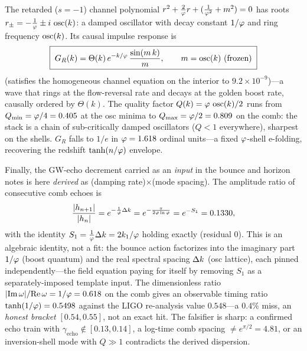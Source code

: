 The retarded ($s=-1$) channel polynomial $r^2+\tfrac{2}{\varphi}r+(\tfrac{1}{\varphi^2}+m^2)=0$ has roots $r_\pm=-\tfrac{1}{\varphi}\pm i\,\operatorname{osc}(k)$: a damped oscillator with decay constant $1/\varphi$ and ring frequency $\operatorname{osc}(k)$. Its causal impulse response is
\begin{equation}
\boxed{\;G_R(k)=\Theta(k)\,e^{-k/\varphi}\,\frac{\sin(m\,k)}{m},\qquad m=\operatorname{osc}(k)\ \text{(frozen)}\;}
\label{eq:fieldeq:greenR}
\end{equation}
(satisfies the homogeneous channel equation on the interior to $9.2\times10^{-9}$)---a wave that rings at the flow-reversal rate and decays at the golden boost rate, causally ordered by $\Theta(k)$. The quality factor $Q(k)=\varphi\,\operatorname{osc}(k)/2$ runs from $Q_{\min}=\varphi/4=0.405$ at the osc minima to $Q_{\max}=\varphi/2=0.809$ on the comb: the stack is a chain of sub-critically damped oscillators ($Q<1$ everywhere), sharpest on the shells. $G_R$ falls to $1/e$ in $\varphi=1.618$ ordinal units---a fixed $\varphi$-shell e-folding, recovering the redshift $\tanh(n/\varphi)$ envelope.

Finally, the GW-echo decrement carried as an \emph{input} in the bounce and horizon notes is here \emph{derived} as (damping rate)$\times$(mode spacing). The amplitude ratio of consecutive comb echoes is
\begin{equation}
\frac{|h_{n+1}|}{|h_n|}=e^{-\frac{1}{\varphi}\Delta k}=e^{-\frac{\pi}{2\varphi\ln\varphi}}=e^{-S_1}=0.1330,
\label{eq:fieldeq:echo}
\end{equation}
with the identity $S_1=\tfrac{1}{\varphi}\Delta k=2k_1/\varphi$ holding exactly (residual $0$). This is an algebraic identity, not a fit: the bounce action factorizes into the imaginary part $1/\varphi$ (boost quantum) and the real spectral spacing $\Delta k$ (osc lattice), each pinned independently---the field equation paying for itself by removing $S_1$ as a separately-imposed template input. The dimensionless ratio $|\mathrm{Im}\,\omega|/\mathrm{Re}\,\omega=1/\varphi=0.618$ on the comb gives an observable timing ratio $\tanh(1/\varphi)=0.5498$ against the LIGO re-analysis value $0.548$---a $0.4\%$ miss, an \emph{honest bracket} $[0.54,0.55]$, not an exact hit. The falsifier is sharp: a confirmed echo train with $\gamma_{\text{echo}}\notin[0.13,0.14]$, a log-time comb spacing $\neq e^{\pi/2}=4.81$, or an inversion-shell mode with $Q\gg1$ contradicts the derived dispersion.
